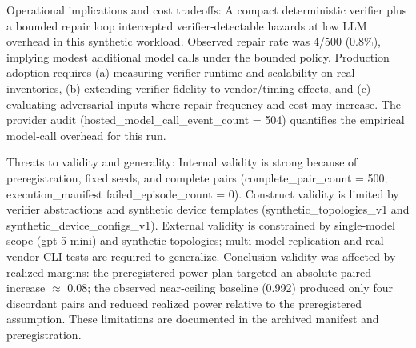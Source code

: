 \documentclass[conference]{IEEEtran}
\begin{document}
Operational implications and cost tradeoffs: A compact deterministic verifier plus a bounded repair loop intercepted verifier‑detectable hazards at low LLM overhead in this synthetic workload. Observed repair rate was 4/500 (0.8\%), implying modest additional model calls under the bounded policy. Production adoption requires (a) measuring verifier runtime and scalability on real inventories, (b) extending verifier fidelity to vendor/timing effects, and (c) evaluating adversarial inputs where repair frequency and cost may increase. The provider audit (hosted\_model\_call\_event\_count = 504) quantifies the empirical model‑call overhead for this run.

Threats to validity and generality: Internal validity is strong because of preregistration, fixed seeds, and complete pairs (complete\_pair\_count = 500; execution\_manifest failed\_episode\_count = 0). Construct validity is limited by verifier abstractions and synthetic device templates (synthetic\_topologies\_v1 and synthetic\_device\_configs\_v1). External validity is constrained by single‑model scope (gpt-5-mini) and synthetic topologies; multi‑model replication and real vendor CLI tests are required to generalize. Conclusion validity was affected by realized margins: the preregistered power plan targeted an absolute paired increase \ensuremath{\approx} 0.08; the observed near‑ceiling baseline (0.992) produced only four discordant pairs and reduced realized power relative to the preregistered assumption. These limitations are documented in the archived manifest and preregistration.
\end{document}
